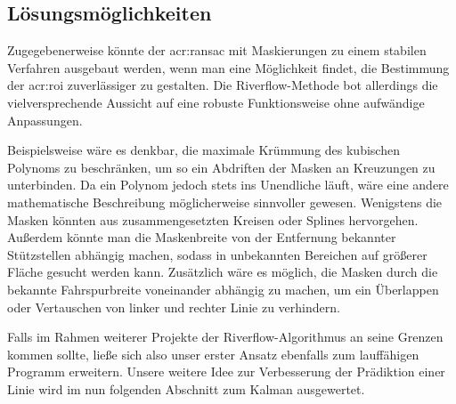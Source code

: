 \subsection{Lösungsmöglichkeiten}

Zugegebenerweise könnte der \gls{acr:ransac} mit Maskierungen zu einem stabilen Verfahren ausgebaut werden, wenn man eine Möglichkeit findet, die Bestimmung der \gls{acr:roi} zuverlässiger zu gestalten. Die Riverflow-Methode bot allerdings die vielversprechende Aussicht auf eine robuste Funktionsweise ohne aufwändige Anpassungen. 

Beispielsweise wäre es denkbar, die maximale Krümmung des kubischen Polynoms zu beschränken, um so ein Abdriften der Masken an Kreuzungen zu unterbinden. Da ein Polynom jedoch stets ins Unendliche läuft, wäre eine andere mathematische Beschreibung möglicherweise sinnvoller gewesen. Wenigstens die Masken könnten aus zusammengesetzten Kreisen oder Splines hervorgehen. Außerdem könnte man die Maskenbreite von der Entfernung bekannter Stützstellen abhängig machen, sodass in unbekannten Bereichen auf größerer Fläche gesucht werden kann. Zusätzlich wäre es möglich, die Masken durch die bekannte Fahrspurbreite voneinander abhängig zu machen, um ein Überlappen oder Vertauschen von linker und rechter Linie zu verhindern.

Falls im Rahmen weiterer Projekte der Riverflow-Algorithmus an seine Grenzen kommen sollte, ließe sich also unser erster Ansatz ebenfalls zum lauffähigen Programm erweitern. Unsere weitere Idee zur Verbesserung der Prädiktion einer Linie wird im nun folgenden Abschnitt zum Kalman ausgewertet.

